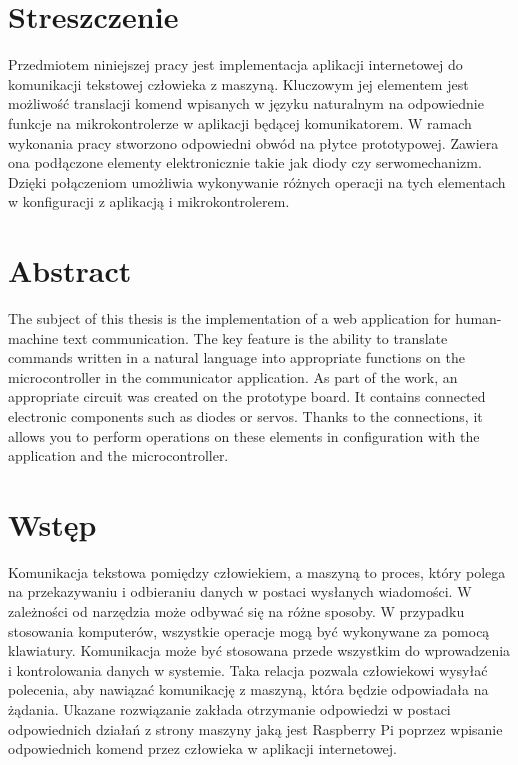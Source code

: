 \section{Streszczenie}
Przedmiotem niniejszej pracy jest implementacja aplikacji internetowej do komunikacji tekstowej człowieka z maszyną. Kluczowym jej elementem jest możliwość translacji komend wpisanych w języku naturalnym na odpowiednie funkcje na mikrokontrolerze w aplikacji będącej komunikatorem. W ramach wykonania pracy stworzono odpowiedni obwód na płytce prototypowej. Zawiera ona podłączone elementy elektronicznie takie jak diody czy serwomechanizm. Dzięki połączeniom umożliwia wykonywanie różnych operacji na tych elementach w konfiguracji z aplikacją i mikrokontrolerem.
\section{Abstract}
The subject of this thesis is the implementation of a web application for human-machine text communication. The key feature is the ability to translate commands written in a natural language into appropriate functions on the microcontroller in the communicator application. As part of the work, an appropriate circuit was created on the prototype board. It contains connected electronic components such as diodes or servos. Thanks to the connections, it allows you to perform operations on these elements in configuration with the application and the microcontroller.
\section{Wstęp}
Komunikacja tekstowa pomiędzy człowiekiem, a maszyną to proces, który polega na przekazywaniu i odbieraniu danych w postaci wysłanych wiadomości. W zależności od narzędzia może odbywać się na różne sposoby. W przypadku stosowania komputerów, wszystkie operacje mogą być wykonywane za pomocą klawiatury. Komunikacja może być stosowana przede wszystkim do wprowadzenia i kontrolowania danych w systemie. Taka relacja pozwala człowiekowi wysyłać polecenia, aby nawiązać komunikację z maszyną, która będzie odpowiadała na żądania. Ukazane rozwiązanie zakłada otrzymanie odpowiedzi w postaci odpowiednich działań z strony maszyny jaką jest Raspberry Pi poprzez wpisanie odpowiednich komend przez człowieka w aplikacji internetowej.
